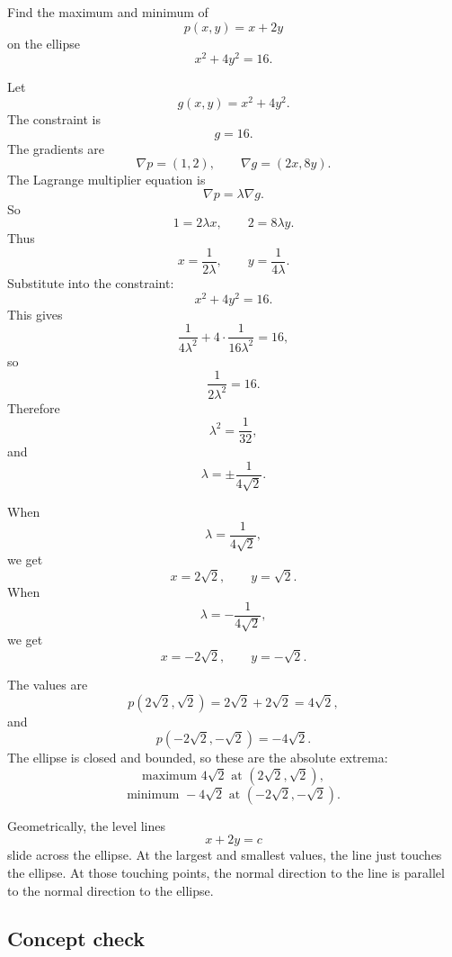 Find the maximum and minimum of
\[
    p(x,y)=x+2y
\]
on the ellipse
\[
    x^2+4y^2=16.
\]

Let
\[
    g(x,y)=x^2+4y^2.
\]
The constraint is
\[
    g=16.
\]
The gradients are
\[
    \nabla p=(1,2),
    \qquad
    \nabla g=(2x,8y).
\]
The Lagrange multiplier equation is
\[
    \nabla p=\lambda\nabla g.
\]
So
\[
    1=2\lambda x,
    \qquad
    2=8\lambda y.
\]
Thus
\[
    x=\frac{1}{2\lambda},
    \qquad
    y=\frac{1}{4\lambda}.
\]
Substitute into the constraint:
\[
    x^2+4y^2=16.
\]
This gives
\[
    \frac{1}{4\lambda^2}
    +
    4\cdot\frac{1}{16\lambda^2}
    =
    16,
\]
so
\[
    \frac{1}{2\lambda^2}=16.
\]
Therefore
\[
    \lambda^2=\frac{1}{32},
\]
and
\[
    \lambda=\pm \frac{1}{4\sqrt2}.
\]

When
\[
    \lambda=\frac{1}{4\sqrt2},
\]
we get
\[
    x=2\sqrt2,
    \qquad
    y=\sqrt2.
\]
When
\[
    \lambda=-\frac{1}{4\sqrt2},
\]
we get
\[
    x=-2\sqrt2,
    \qquad
    y=-\sqrt2.
\]

The values are
\[
    p(2\sqrt2,\sqrt2)=2\sqrt2+2\sqrt2=4\sqrt2,
\]
and
\[
    p(-2\sqrt2,-\sqrt2)=-4\sqrt2.
\]
The ellipse is closed and bounded, so these are the absolute extrema:
\[
\boxed{
    \text{maximum }4\sqrt2\text{ at }(2\sqrt2,\sqrt2),
}
\]
\[
\boxed{
    \text{minimum }-4\sqrt2\text{ at }(-2\sqrt2,-\sqrt2).
}
\]

Geometrically, the level lines
\[
    x+2y=c
\]
slide across the ellipse.  At the largest and smallest values, the line just touches the
ellipse.  At those touching points, the normal direction to the line is parallel to the
normal direction to the ellipse.

\subsection{Concept check}

